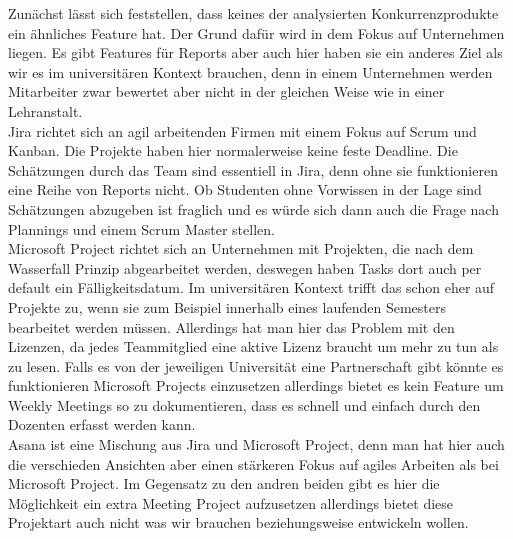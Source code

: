 Zunächst lässt sich feststellen, dass keines der analysierten Konkurrenzprodukte ein ähnliches Feature hat. Der Grund dafür wird in dem Fokus auf Unternehmen liegen. Es gibt Features für Reports aber auch hier haben sie ein anderes Ziel als wir es im universitären Kontext brauchen, denn in einem Unternehmen werden Mitarbeiter zwar bewertet aber nicht in der gleichen Weise wie in einer Lehranstalt.\\
Jira richtet sich an agil arbeitenden Firmen mit einem Fokus auf Scrum und Kanban. Die Projekte haben hier normalerweise keine feste Deadline. Die Schätzungen durch das Team sind essentiell in Jira, denn ohne sie funktionieren eine Reihe von Reports nicht. Ob Studenten ohne Vorwissen in der Lage sind Schätzungen abzugeben ist fraglich und es würde sich dann auch die Frage 
nach Plannings und einem Scrum Master stellen.\\
Microsoft Project richtet sich an Unternehmen mit Projekten, die nach dem Wasserfall Prinzip abgearbeitet werden, deswegen haben Tasks dort auch per default ein Fälligkeitsdatum. Im universitären Kontext trifft das schon eher auf Projekte zu, wenn sie zum Beispiel innerhalb eines laufenden Semesters bearbeitet werden müssen.  Allerdings hat man hier das Problem mit den Lizenzen, da jedes Teammitglied eine aktive Lizenz braucht um mehr zu tun als zu lesen. Falls es von der jeweiligen Universität eine Partnerschaft gibt könnte es funktionieren Microsoft Projects einzusetzen allerdings bietet es kein Feature um Weekly Meetings so zu dokumentieren, dass es schnell und einfach durch den Dozenten erfasst werden kann.\\
Asana ist eine Mischung aus Jira und Microsoft Project, denn man hat hier auch die verschieden Ansichten aber einen stärkeren Fokus auf agiles Arbeiten als bei Microsoft Project. Im Gegensatz zu den andren beiden gibt es hier die Möglichkeit ein extra Meeting Project aufzusetzen allerdings bietet diese Projektart auch nicht was wir brauchen beziehungsweise entwickeln wollen. 

\clearpage